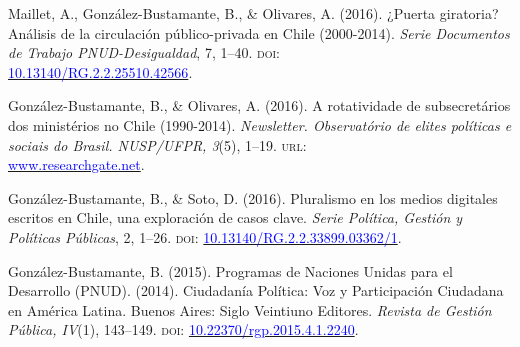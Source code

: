 
\begin{publications}

\begin{benumerate}{4}

\item{Maillet, A., González-Bustamante, B., \& Olivares, A. (2016). ¿Puerta giratoria? Análisis de la circulación público-privada en Chile (2000-2014). {\itshape Serie Documentos de Trabajo PNUD-Desigualdad}, 7, 1--40. {\scshape doi:} \\ \href{http://doi.org/10.13140/RG.2.2.25510.42566}{\textcolor{blue}{10.13140/RG.2.2.25510.42566}}.}\vspace{1mm}

\item{González-Bustamante, B., \& Olivares, A. (2016). A rotatividade de subsecretários dos ministérios no Chile (1990-2014). {\itshape Newsletter. Observat\'orio de elites pol\'iticas e sociais do Brasil. NUSP/UFPR, 3}(5), 1--19. {\scshape url:} \\ \href{https://www.researchgate.net/publication/321993740_A_rotatividade_de_subsecretarios_dos_ministerios_no_Chile_1990-2014}{\textcolor{blue}{www.researchgate.net}}.}\vspace{1mm}

\item{González-Bustamante, B., \& Soto, D. (2016). Pluralismo en los medios digitales escritos en Chile, una exploración de casos clave. {\itshape Serie Política, Gestión y Políticas Públicas}, 2, 1--26. {\scshape doi:} \href{http://doi.org/10.13140/RG.2.2.33899.03362/1}{\textcolor{blue}{10.13140/RG.2.2.33899.03362/1}}.}\vspace{1mm}

\item{González-Bustamante, B. (2015). Programas de Naciones Unidas para el Desarrollo (PNUD). (2014). Ciudadanía Política: Voz y Participación Ciudadana en América Latina. Buenos Aires: Siglo Veintiuno Editores. {\itshape Revista de Gestión Pública, IV}(1), 143--149. {\scshape doi:} \href{https://doi.org/10.22370/rgp.2015.4.1.2240}{\textcolor{blue}{10.22370/rgp.2015.4.1.2240}}.}

\end{benumerate}

\end{publications}
